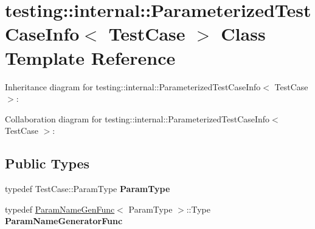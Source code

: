 \hypertarget{classtesting_1_1internal_1_1ParameterizedTestCaseInfo}{}\section{testing\+:\+:internal\+:\+:Parameterized\+Test\+Case\+Info$<$ Test\+Case $>$ Class Template Reference}
\label{classtesting_1_1internal_1_1ParameterizedTestCaseInfo}


Inheritance diagram for testing\+:\+:internal\+:\+:Parameterized\+Test\+Case\+Info$<$ Test\+Case $>$\+:


Collaboration diagram for testing\+:\+:internal\+:\+:Parameterized\+Test\+Case\+Info$<$ Test\+Case $>$\+:
\subsection*{Public Types}
\begin{DoxyCompactItemize}
\item 
\mbox{\label{classtesting_1_1internal_1_1ParameterizedTestCaseInfo_a643a87e178bf92a4246ce21054e44b96}} 
typedef Test\+Case\+::\+Param\+Type {\bfseries Param\+Type}
\item 
\mbox{\label{classtesting_1_1internal_1_1ParameterizedTestCaseInfo_aed6c5184cb8f94cec73e9d7c4b7fa2ce}} 
typedef \hyperlink{structtesting_1_1internal_1_1ParamNameGenFunc}{Param\+Name\+Gen\+Func}$<$ Param\+Type $>$\+::Type {\bfseries Param\+Name\+Generator\+Func}
\end{DoxyCompactItemize}
